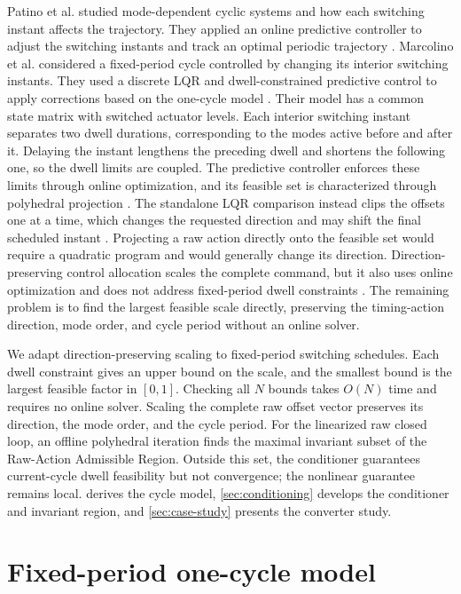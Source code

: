 \documentclass[pdflatex,iicol,sn-mathphys-ay]{sn-jnl}
\begin{document}
Patino et al. studied mode-dependent cyclic systems and how each switching instant affects the trajectory. They applied an online predictive controller to adjust the switching instants and track an optimal periodic trajectory \cite{patino2010}. Marcolino et al. considered a fixed-period cycle controlled by changing its interior switching instants. They used a discrete LQR and dwell-constrained predictive control to apply corrections based on the one-cycle model \cite{marcolino2021}. Their model has a common state matrix with switched actuator levels. Each interior switching instant separates two dwell durations, corresponding to the modes active before and after it. Delaying the instant lengthens the preceding dwell and shortens the following one, so the dwell limits are coupled. The predictive controller enforces these limits through online optimization, and its feasible set is characterized through polyhedral projection \cite{marcolino2021}. The standalone LQR comparison instead clips the offsets one at a time, which changes the requested direction and may shift the final scheduled instant \cite{marcolino2021}. Projecting a raw action directly onto the feasible set would require a quadratic program and would generally change its direction. Direction-preserving control allocation scales the complete command, but it also uses online optimization and does not address fixed-period dwell constraints \cite{nakamuraZimmerer2026directionPreserving}. The remaining problem is to find the largest feasible scale directly, preserving the timing-action direction, mode order, and cycle period without an online solver.

We adapt direction-preserving scaling to fixed-period switching schedules. Each dwell constraint gives an upper bound on the scale, and the smallest bound is the largest feasible factor in $[0,1]$. Checking all $N$ bounds takes $O(N)$ time and requires no online solver. Scaling the complete raw offset vector preserves its direction, the mode order, and the cycle period. For the linearized raw closed loop, an offline polyhedral iteration finds the maximal invariant subset of the Raw-Action Admissible Region. Outside this set, the conditioner guarantees current-cycle dwell feasibility but not convergence; the nonlinear guarantee remains local.  derives the cycle model, \cref{sec:conditioning} develops the conditioner and invariant region, and \cref{sec:case-study} presents the converter study.

\section{Fixed-period one-cycle model}
\label{sec:model}
\end{document}
